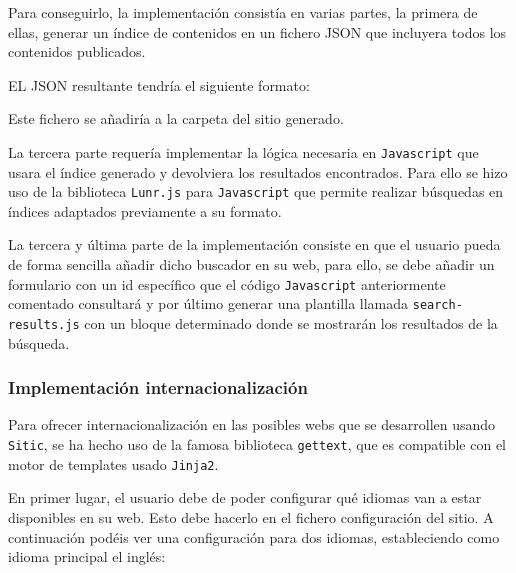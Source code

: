 Para conseguirlo, la implementación consistía en varias partes, la primera de ellas, generar un índice de contenidos
en un fichero JSON que incluyera todos los contenidos publicados.

EL JSON resultante tendría el siguiente formato:

\begin{jsoncode}
\end{jsoncode}

Este fichero se añadiría a la carpeta del sitio generado.

La tercera parte requería implementar la lógica necesaria en \texttt{Javascript} que usara el índice generado
y devolviera los resultados encontrados. Para ello se hizo uso de la biblioteca \texttt{Lunr.js} para
\texttt{Javascript} que permite realizar búsquedas en índices adaptados previamente a su formato.

La tercera y última parte de la implementación consiste en que el usuario pueda de forma sencilla añadir dicho buscador en
su web, para ello, se debe añadir un formulario con un id específico que el código \texttt{Javascript} anteriormente
comentado consultará y por último generar una plantilla llamada \texttt{search-results.js} con un bloque
determinado donde se mostrarán los resultados de la búsqueda.

\subsubsection{Implementación internacionalización}

Para ofrecer internacionalización en las posibles webs que se desarrollen usando \texttt{Sitic}, se ha hecho uso
de la famosa biblioteca \texttt{gettext}, que es compatible con el motor de templates usado \texttt{Jinja2}.

En primer lugar, el usuario debe de poder configurar qué idiomas van a estar disponibles en su web. Esto debe hacerlo
en el fichero configuración del sitio. A continuación podéis ver una configuración para dos idiomas, estableciendo como
idioma principal el inglés:


